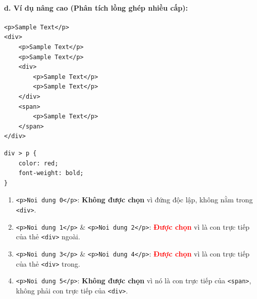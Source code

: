\documentclass[11pt,oneside]{book}
\newcommand{\codeinline}[1]{\textcolor{accentOrange}{\texttt{#1}}}
\begin{document}
\paragraph{d. Ví dụ nâng cao (Phân tích lồng ghép nhiều cấp):}

\begin{codeWindow}
\begin{lstlisting}[language=HTML5]
<p>Sample Text</p>
<div>
    <p>Sample Text</p>
    <p>Sample Text</p>
    <div>
        <p>Sample Text</p>
        <p>Sample Text</p>
    </div>
    <span>
        <p>Sample Text</p>
    </span>
</div>
\end{lstlisting}

\begin{lstlisting}[language=CSS3]
div > p {
    color: red;
    font-weight: bold;
}
\end{lstlisting}
\end{codeWindow}

\begin{noteBox}
\begin{enumerate}[leftmargin=1.5em, itemsep=3pt, parsep=0pt]
    \item \codeinline{<p>Noi dung 0</p>}: \textbf{Không được chọn} vì đứng độc lập, không nằm trong \codeinline{<div>}.
    \item \codeinline{<p>Noi dung 1</p>} \& \codeinline{<p>Noi dung 2</p>}: \textcolor{red}{\textbf{Được chọn}} vì là con trực tiếp của thẻ \codeinline{<div>} ngoài.
    \item \codeinline{<p>Noi dung 3</p>} \& \codeinline{<p>Noi dung 4</p>}: \textcolor{red}{\textbf{Được chọn}} vì là con trực tiếp của thẻ \codeinline{<div>} trong.
    \item \codeinline{<p>Noi dung 5</p>}: \textbf{Không được chọn} vì nó là con trực tiếp của \codeinline{<span>}, không phải con trực tiếp của \codeinline{<div>}.
\end{enumerate}
\end{noteBox}
\end{document}

